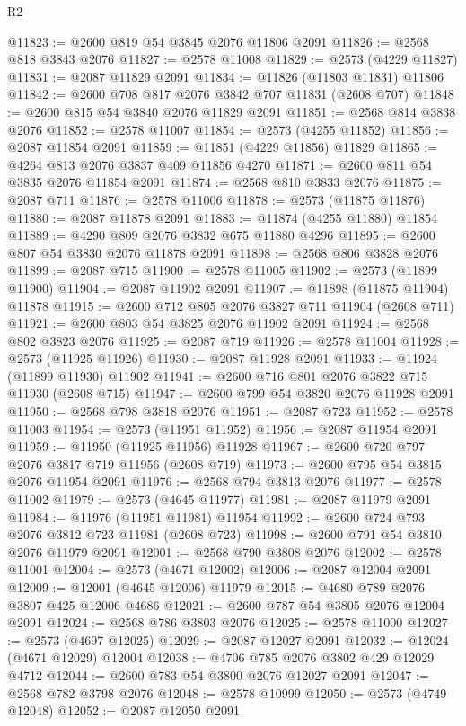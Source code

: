 \begin{lexlean}{R2}
\begin{coremodule}
@11823 := @2600 @819 @54 @3845 @2076 @11806 @2091
@11826 := @2568 @818 @3843 @2076
@11827 := @2578 @11008
@11829 := @2573 (@4229 @11827)
@11831 := @2087 @11829 @2091
@11834 := @11826 (@11803 @11831) @11806
@11842 := @2600 @708 @817 @2076 @3842 @707 @11831 (@2608 @707)
@11848 := @2600 @815 @54 @3840 @2076 @11829 @2091
@11851 := @2568 @814 @3838 @2076
@11852 := @2578 @11007
@11854 := @2573 (@4255 @11852)
@11856 := @2087 @11854 @2091
@11859 := @11851 (@4229 @11856) @11829
@11865 := @4264 @813 @2076 @3837 @409 @11856 @4270
@11871 := @2600 @811 @54 @3835 @2076 @11854 @2091
@11874 := @2568 @810 @3833 @2076
@11875 := @2087 @711
@11876 := @2578 @11006
@11878 := @2573 (@11875 @11876)
@11880 := @2087 @11878 @2091
@11883 := @11874 (@4255 @11880) @11854
@11889 := @4290 @809 @2076 @3832 @675 @11880 @4296
@11895 := @2600 @807 @54 @3830 @2076 @11878 @2091
@11898 := @2568 @806 @3828 @2076
@11899 := @2087 @715
@11900 := @2578 @11005
@11902 := @2573 (@11899 @11900)
@11904 := @2087 @11902 @2091
@11907 := @11898 (@11875 @11904) @11878
@11915 := @2600 @712 @805 @2076 @3827 @711 @11904 (@2608 @711)
@11921 := @2600 @803 @54 @3825 @2076 @11902 @2091
@11924 := @2568 @802 @3823 @2076
@11925 := @2087 @719
@11926 := @2578 @11004
@11928 := @2573 (@11925 @11926)
@11930 := @2087 @11928 @2091
@11933 := @11924 (@11899 @11930) @11902
@11941 := @2600 @716 @801 @2076 @3822 @715 @11930 (@2608 @715)
@11947 := @2600 @799 @54 @3820 @2076 @11928 @2091
@11950 := @2568 @798 @3818 @2076
@11951 := @2087 @723
@11952 := @2578 @11003
@11954 := @2573 (@11951 @11952)
@11956 := @2087 @11954 @2091
@11959 := @11950 (@11925 @11956) @11928
@11967 := @2600 @720 @797 @2076 @3817 @719 @11956 (@2608 @719)
@11973 := @2600 @795 @54 @3815 @2076 @11954 @2091
@11976 := @2568 @794 @3813 @2076
@11977 := @2578 @11002
@11979 := @2573 (@4645 @11977)
@11981 := @2087 @11979 @2091
@11984 := @11976 (@11951 @11981) @11954
@11992 := @2600 @724 @793 @2076 @3812 @723 @11981 (@2608 @723)
@11998 := @2600 @791 @54 @3810 @2076 @11979 @2091
@12001 := @2568 @790 @3808 @2076
@12002 := @2578 @11001
@12004 := @2573 (@4671 @12002)
@12006 := @2087 @12004 @2091
@12009 := @12001 (@4645 @12006) @11979
@12015 := @4680 @789 @2076 @3807 @425 @12006 @4686
@12021 := @2600 @787 @54 @3805 @2076 @12004 @2091
@12024 := @2568 @786 @3803 @2076
@12025 := @2578 @11000
@12027 := @2573 (@4697 @12025)
@12029 := @2087 @12027 @2091
@12032 := @12024 (@4671 @12029) @12004
@12038 := @4706 @785 @2076 @3802 @429 @12029 @4712
@12044 := @2600 @783 @54 @3800 @2076 @12027 @2091
@12047 := @2568 @782 @3798 @2076
@12048 := @2578 @10999
@12050 := @2573 (@4749 @12048)
@12052 := @2087 @12050 @2091

\end{coremodule}
\end{lexlean}
